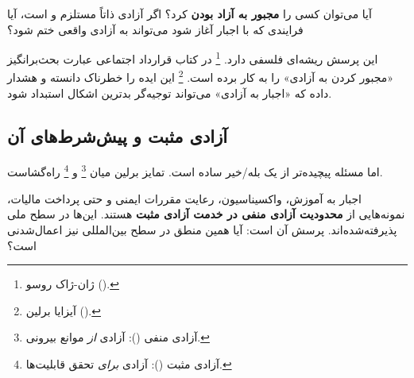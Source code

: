\begin{tcolorbox}[defbox, title={پارادوکس اجبار به آزادی}]
	آیا می‌توان کسی را \textbf{مجبور به آزاد بودن} کرد؟ اگر آزادی
	ذاتاً مستلزم  و  است،
	آیا فرایندی که با اجبار آغاز شود می‌تواند به آزادی واقعی ختم شود؟
\end{tcolorbox}

این پرسش ریشه‌ای فلسفی دارد.
%
\footnote{%
	ژان-ژاک روسو ().%
}%
در کتاب قرارداد اجتماعی عبارت بحث‌برانگیز «مجبور کردن
به آزادی» را به کار برده
است.
%
\footnote{%
	آیزایا برلین ().%
}%
این ایده را خطرناک دانسته و هشدار داده که «اجبار به آزادی» می‌تواند
توجیه‌گر بدترین اشکال استبداد
شود.

\subsection{آزادی مثبت و پیش‌شرط‌های آن}
\label{subsec:ch02-t2-positive}

اما مسئله پیچیده‌تر از یک بله/خیر ساده است. تمایز برلین
میان %
\footnote{آزادی منفی (): آزادی \textit{از}
	موانع بیرونی.}%
و %
\footnote{آزادی مثبت (): آزادی \textit{برای}
	تحقق قابلیت‌ها.}%
راه‌گشاست.

اجبار به آموزش، واکسیناسیون، رعایت مقررات ایمنی و حتی پرداخت
مالیات، نمونه‌هایی از \textbf{محدودیت آزادی منفی در خدمت آزادی
	مثبت} هستند. این‌ها در سطح ملی پذیرفته‌شده‌اند. پرسش آن است:
آیا همین منطق در سطح بین‌المللی نیز اعمال‌شدنی است؟

